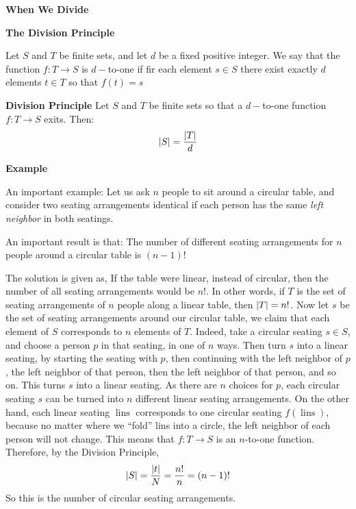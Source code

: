 \textbf{When We Divide}

\textbf{The Division Principle}

\begin{define}
	Let $S$ and $T$ be finite sets, and let $d$ be a fixed positive integer. We say that the function $ f:T \rightarrow S $ is $d-$to-one if fir each element $s \in S$ there exist exactly $d$ elements $ t \in T$ so that $f(t) = s$
\end{define}

\begin{thm}
	\textbf{Division Principle} Let $S$ and $T$ be finite sets so that a $d-$to-one function $ f: T \rightarrow S $ exits. Then:
	\[ \left| S \right| = \frac{\left| T \right|}{d} \]
\end{thm}

\textbf{Example}

An important example: Let us ask $n$ people to sit around a circular table, and consider two seating arrangements identical if each person has the same \textit{left neighbor} in both seatings.

An important result is that: The number of different seating arrangements for $n$ people around a circular table is $ (n-1)! $

The solution is given as, If the table were linear, instead of circular, then the number of all seating arrangements would be $n!$. In other words, if $T$ is the set of seating arrangements of $n$ people along a linear table, then $ \left| T \right| = n! $. Now let $s$ be the set of seating arrangements  around our circular table, we claim that each element of $S$ corresponds to $n$ elements of $T$. Indeed, take a circular seating $s \in S$, and choose a person $p$ in that seating, in one of $n$ ways. Then turn $s$ into a linear seating, by starting the seating with $p$, then continuing with the left neighbor of $p$, the left neighbor of that person, then the left neighbor of that person, and so on. This turns $s$ into a linear seating. As there are $n$ choices for $p$, each circular seating $s$ can be turned into $n$ different linear seating arrangements.
On the other hand, each linear seating $ \operatorname{lins} $ corresponds to one circular seating $f(\operatorname{lins})$, because no matter where we ``fold'' lins into a circle, the left neighbor of each person will not change.
This means that $ f:T \rightarrow S $ is an $n$-to-one function. Therefore, by the Division Principle, 
\[ \left| S \right| = \frac{\left| t \right|}{N} = \frac{n!}{n} = (n-1)! \]
So this is the number of circular seating arrangements.



 
